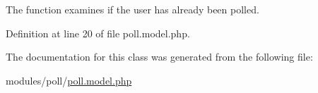 The function examines if the user has already been polled. 



Definition at line 20 of file poll.\-model.\-php.



The documentation for this class was generated from the following file\-:\begin{DoxyCompactItemize}
\item 
modules/poll/\hyperlink{poll_8model_8php}{poll.\-model.\-php}\end{DoxyCompactItemize}

